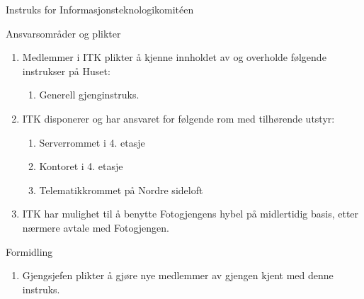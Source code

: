 \begin{instruks*}{Instruks for Informasjonsteknologikomit\'een}
    \begin{instruksledd}{Ansvarsområder og plikter}
        \begin{enumerate}
            \item Medlemmer i ITK plikter å kjenne innholdet av og overholde følgende instrukser på Huset:
                \begin{enumerate}
                    \item  Generell gjenginstruks.
                \end{enumerate}
            \item ITK disponerer og har ansvaret for følgende rom med tilhørende utstyr:
                \begin{enumerate}
                    \item Serverrommet i 4. etasje
                    \item Kontoret i 4. etasje
                    \item Telematikkrommet på Nordre sideloft
                \end{enumerate}
            \item ITK har mulighet til å benytte Fotogjengens hybel på midlertidig basis, etter nærmere
                 avtale med Fotogjengen.
        \end{enumerate}
    \end{instruksledd}

    \begin{instruksledd}{Formidling}
        \begin{enumerate}
            \item Gjengsjefen plikter å gjøre nye medlemmer av gjengen kjent med denne
                instruks.
        \end{enumerate}
    \end{instruksledd}


\end{instruks*}
